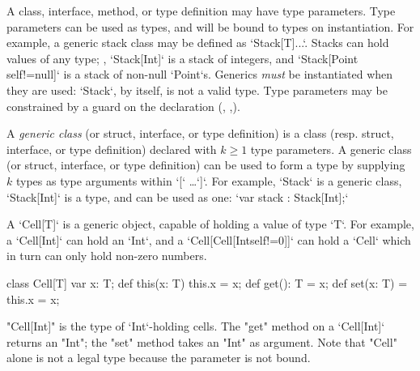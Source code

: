 \label{Generics}

A class, interface, method, or type definition  may have type
parameters.  Type parameters can be used as types, and will be bound to types
on instantiation.  
For example, a generic stack class may be defined as 
\xcd`Stack[T]{...}`.  Stacks can hold values of any type; \eg, 
\xcd`Stack[Int]` is a stack of integers, and 
\xcd`Stack[Point {self!=null}]` is a stack of non-null \xcd`Point`s.
Generics {\em must} be instantiated when they are used: \xcd`Stack`, by
itself, is not a valid type.
Type parameters may be constrained by a guard on the declaration
(,
,).

A {\em generic class} (or struct, interface, or type definition) 
is a class (resp. struct, interface, or type definition) 
declared with $k \geq 1$ type parameters. 
A generic class (or struct, interface, or type definition) 
can be used to form a type by supplying $k$ types as type arguments within
\xcd`[` \ldots \xcd`]`.
For example,
\xcd`Stack` is a generic class, 
\xcd`Stack[Int]` is a type, and can be used as one: 
\xcd`var stack : Stack[Int];`

\begin{ex}A \xcd`Cell[T]` is a generic object, capable of holding a value of type
\xcd`T`.  For example, a \xcd`Cell[Int]` can hold an \xcd`Int`, and a
\xcd`Cell[Cell[Int{self!=0}]]` can hold a \xcd`Cell` which in turn can
only hold non-zero numbers. 
\begin{xten}
class Cell[T] {
    var x: T;
    def this(x: T) { this.x = x; }
    def get(): T = x;
    def set(x: T) = { this.x = x; }
}
\end{xten}


\xcd"Cell[Int]" is the type of \xcd`Int`-holding cells.  
The \xcd"get" method on a \xcd`Cell[Int]` returns an \xcd"Int"; the
\xcd"set" method takes an \xcd"Int" as argument.  Note that
\xcd"Cell" alone is not a legal type because the parameter is
not bound.
\end{ex}

